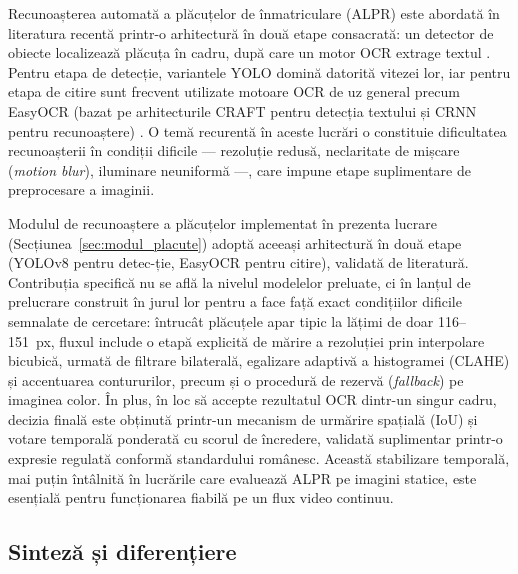 \documentclass[../../main.tex]{subfiles}
\begin{document}
Recunoașterea automată a plăcuțelor de înmatriculare (ALPR) este abordată în literatura recentă printr-o arhitectură în două etape consacrată: un detector de obiecte localizează plăcuța în cadru, după care un motor OCR extrage textul \cite{alpr_yolov8_2024, alpr_review2025}. Pentru etapa de detecție, variantele YOLO domină datorită vitezei lor, iar pentru etapa de citire sunt frecvent utilizate motoare OCR de uz general precum EasyOCR (bazat pe arhitecturile CRAFT pentru detecția textului și CRNN pentru recunoaștere) \cite{alpr_yolov8_2024}. O temă recurentă în aceste lucrări o constituie dificultatea recunoașterii în condiții dificile --- rezoluție redusă, neclaritate de mișcare (\emph{motion blur}), iluminare neuniformă ---, care impune etape suplimentare de preprocesare a imaginii.

Modulul de recunoaștere a plăcuțelor implementat în prezenta lucrare \linebreak (Secțiunea~\ref{sec:modul_placute}) adoptă aceeași arhitectură în două etape (YOLOv8 pentru detec-ție, EasyOCR pentru citire), validată de literatură. Contribuția specifică nu se află la nivelul modelelor preluate, ci în lanțul de prelucrare construit în jurul lor pentru a face față exact condițiilor dificile semnalate de cercetare: întrucât plăcuțele apar tipic la lățimi de doar 116--151~px, fluxul include o etapă explicită de mărire a rezoluției prin interpolare bicubică, urmată de filtrare bilaterală, egalizare adaptivă a histogramei (CLAHE) și accentuarea contururilor, precum și o procedură de rezervă (\emph{fallback}) pe imaginea color. În plus, în loc să accepte rezultatul OCR dintr-un singur cadru, decizia finală este obținută printr-un mecanism de urmărire spațială (IoU) și votare temporală ponderată cu scorul de încredere, validată suplimentar printr-o expresie regulată conformă standardului românesc. Această stabilizare temporală, mai puțin întâlnită în lucrările care evaluează ALPR pe imagini statice, este esențială pentru funcționarea fiabilă pe un flux video continuu.

\subsection{Sinteză și diferențiere}
\label{subsec:cercetare_sinteza}
\end{document}
